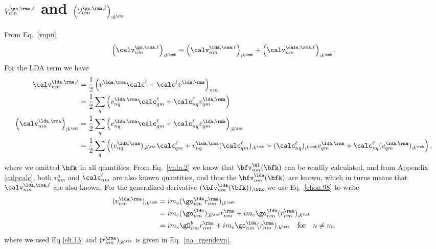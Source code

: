 \chapter{\texorpdfstring{$V^{\gs,\rma,\ell}_{nm}$}{Vnm} and \texorpdfstring{$\Big({\cal V}^{\gs,\rma,\ell}_{nm}\Big)_{;k^\rmb}$}{(Vnm);kb} }\label{calvs}

From Eq.~\eqref{vopii}
\begin{align}\label{a.1}
\left(
\calv^{\gs,\rma,\ell}_{nm}
\right)_{;k^\rmb}
=
\left(
\calv^{\lda,\rma,\ell}_{nm}
\right)_{;k^\rmb}
+
\left(
\calv^{\cals,\rma,\ell}_{nm}
\right)_{;k^\rmb}
.
\end{align} 
For the LDA term we have
\begin{align}\label{a.2}
\calv^{\lda,\rma,\ell}_{nm}
&=
\frac{1}{2}\left(  
v^{\lda,\rma}\calc^\ell+\calc^\ell v^{\lda,\rma}
\right)_{nm}
\nonumber\\
&=
\frac{1}{2}\sum_q\left(  
v^{\lda,\rma}_{nq}\calc^\ell_{qm}+\calc^\ell_{nq} v^{\lda,\rma}_{qm}
\right)
\nonumber\\
\left(\calv^{\lda,\rma}_{nm}\right)_{;k^\rmb}
&=
\frac{1}{2}\sum_q\left(  
v^{\lda,\rma}_{nq}\calc^\ell_{qm}+\calc^\ell_{nq} v^{\lda,\rma}_{qm}
\right) _{;k^\rmb}
\nonumber\\
&=
\frac{1}{2}\sum_q\left(
(v^{\lda,\rma}_{nq})_{;k^\rmb}\calc^\ell_{qm}
+   
v^{\lda,\rma}_{nq}(\calc^\ell_{qm})_{;k^\rmb}
+
(\calc^\ell_{nq})_{;k^\rmb} v^{\lda,\rma}_{qm}
+
\calc^\ell_{nq} (v^{\lda,\rma}_{qm})_{;k^\rmb}
\right)
,
\end{align}   
where we omitted $\bfk$ in all quantities.
From Eq.~\eqref{vnln.2} we know that $\bfv^\nl_{nm}(\bfk)$
 can be readily
calculated,
and from Appendix \ref{calpcalc}, both $v^a_{nm}$ and
$\calc_{nm}^\ell$ are also known quantities, 
 and thus the
$\bfv^\lda_{nm}(\bfk)$ are known, which in turns means that 
$\calv^{\lda,\rma,\ell}_{nm}$ are also known.
For the generalized derivative 
$(\bfv^\lda_{nm}(\bfk))_{;\bfk}$ we use Eq.~\eqref{chon.98}
to write
\begin{align}\label{a.3}
(v^{\lda,\rma}_{nm})_{;k^\rmb}
&=  
im_e(\go^\lda_{nm}r^\rma_{nm})_{;k^\rmb}
\nonumber\\
&=  
im_e(\go^\lda_{nm})_{;k^\rmb} r^\rma_{nm}
+  
im_e\go^\lda_{nm}(r^\rma_{nm})_{;k^\rmb}
\nonumber\\
&=  
im_e\gD^b_{nm}r^\rma_{nm}
+ 
im_e\go^\lda_{nm}(r^\rma_{nm})_{;k^\rmb}
\quad\mathrm{for}\quad n\ne m
,
\end{align} 
where we used Eq \eqref{eli.13} and $(r^\rma_{nm})_{;k^\rmb}$ is given
in Eq.~\eqref{na_rgendevn}.

